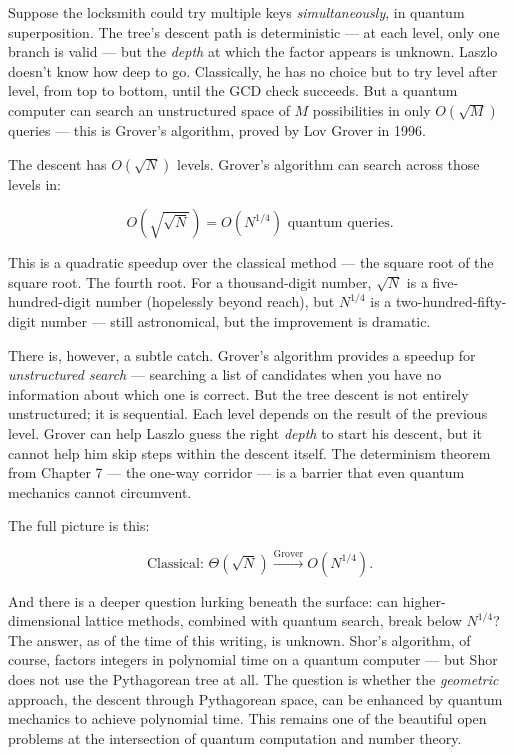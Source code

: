 \documentclass[11pt,openany]{book}
\theoremstyle{definition}
\theoremstyle{plain}
\theoremstyle{remark}
\begin{document}
Suppose the locksmith could try multiple keys \textit{simultaneously}, in quantum superposition. The tree's descent path is deterministic — at each level, only one branch is valid — but the \textit{depth} at which the factor appears is unknown. Laszlo doesn't know how deep to go. Classically, he has no choice but to try level after level, from top to bottom, until the GCD check succeeds. But a quantum computer can search an unstructured space of $M$ possibilities in only $O(\sqrt{M})$ queries — this is Grover's algorithm, proved by Lov Grover in 1996.

The descent has $O(\sqrt{N})$ levels. Grover's algorithm can search across those levels in:

$$O\!\left(\sqrt{\sqrt{N}}\right) = O\!\left(N^{1/4}\right) \text{ quantum queries.}$$

This is a quadratic speedup over the classical method — the square root of the square root. The fourth root. For a thousand-digit number, $\sqrt{N}$ is a five-hundred-digit number (hopelessly beyond reach), but $N^{1/4}$ is a two-hundred-fifty-digit number — still astronomical, but the improvement is dramatic.

There is, however, a subtle catch. Grover's algorithm provides a speedup for \textit{unstructured search} — searching a list of candidates when you have no information about which one is correct. But the tree descent is not entirely unstructured; it is sequential. Each level depends on the result of the previous level. Grover can help Laszlo guess the right \textit{depth} to start his descent, but it cannot help him skip steps within the descent itself. The determinism theorem from Chapter 7 — the one-way corridor — is a barrier that even quantum mechanics cannot circumvent.

The full picture is this:

$$\text{Classical: } \Theta(\sqrt{N}) \xrightarrow{\text{Grover}} O(N^{1/4}).$$

And there is a deeper question lurking beneath the surface: can higher-dimensional lattice methods, combined with quantum search, break below $N^{1/4}$? The answer, as of the time of this writing, is unknown. Shor's algorithm, of course, factors integers in polynomial time on a quantum computer — but Shor does not use the Pythagorean tree at all. The question is whether the \textit{geometric} approach, the descent through Pythagorean space, can be enhanced by quantum mechanics to achieve polynomial time. This remains one of the beautiful open problems at the intersection of quantum computation and number theory.
\end{document}
